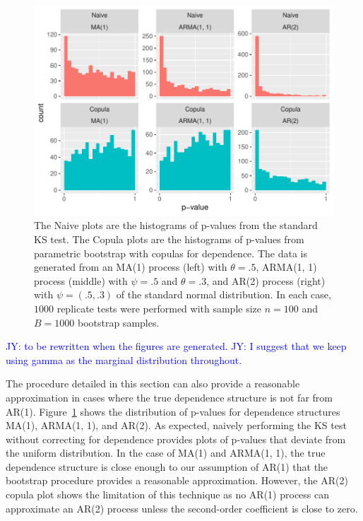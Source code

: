 \documentclass[12pt, letterpaper, titlepage]{article}
\newcommand{\jy}[1]{\textcolor{blue}{JY: #1}}
\begin{document}
\begin{figure}[tbp]
  \centering
  \includegraphics[width=\textwidth]{hist_ma1_arma_ar2_D}
  \caption{The Naive plots are the histograms of p-values from the standard KS
  test. The Copula plots are the histograms of p-values from parametric
  bootstrap with copulas for dependence. The data is generated from an MA(1)
  process (left) with $\theta = .5$, ARMA(1, 1) process (middle) with $\psi =
  .5$ and $\theta = .3$, and AR(2) process (right) with $\psi = (.5, .3)$ of the
  standard normal distribution. In each case, $1000$ replicate tests were
  performed with sample size $n = 100$ and $B = 1000$ bootstrap samples.}
  \label{fig:hist_ma1_arma_ar2_D}
\end{figure}

\jy{to be rewritten when the figures are generated.}
\jy{I suggest that we keep using gamma as the marginal distribution throughout.}

The procedure detailed in this section can also provide a reasonable
approximation in cases where the true dependence structure is not far from
AR(1). Figure~\ref{fig:hist_ma1_arma_ar2_D} shows the distribution of p-values
for dependence structures MA(1), ARMA(1, 1), and AR(2). As expected,
naively performing the KS test without correcting for dependence provides plots
of p-values that deviate from the uniform distribution. In the case of MA(1)
and ARMA(1, 1), the true dependence structure is close enough to our
assumption of AR(1) that the bootstrap procedure provides a reasonable
approximation. However, the AR(2) copula plot shows the limitation of this
technique as no AR(1) process can approximate an AR(2) process unless the
second-order coefficient is close to zero.
\end{document}
